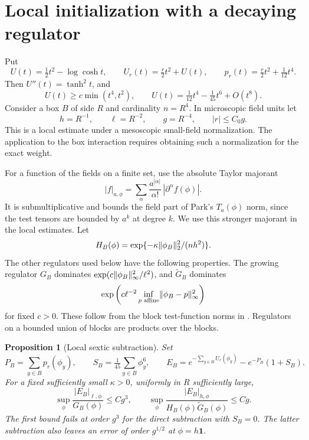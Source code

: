 \documentclass[11pt]{article}
\newtheorem{proposition}{Proposition}[section]
\DeclarePairedDelimiter{\norm}{\lVert}{\rVert}
\begin{document}
\section{Local initialization with a decaying regulator}

Put
\[
U(t)=\tfrac12t^2-\log\cosh t,\qquad
U_r(t)=\tfrac r2t^2+U(t),\qquad
p_r(t)=\tfrac r2t^2+\tfrac1{12}t^4.
\]
Then \(U''(t)=\tanh^2t\), and
\begin{equation}\label{eq:utaylor}
 U(t)\ge c\min(t^4,t^2),\qquad
 U(t)=\tfrac1{12}t^4-\tfrac1{45}t^6+O(t^8).
\end{equation}
Consider a box \(B\) of side \(R\) and cardinality \(n=R^4\). In microscopic field units let
\[
 h=R^{-1},\qquad \ell=R^{-2},\qquad g=R^{-4},
 \qquad |r|\le C_0g.
\]
This is a local estimate under a mesoscopic small-field normalization. The application to the box interaction requires obtaining such a normalization for the exact weight.

For a function of the fields on a finite set, use the absolute Taylor majorant
\[
 |f|_{a,\phi}=\sum_{\alpha}
 \frac{a^{|\alpha|}}{\alpha!}\,|\partial^\alpha f(\phi)|.
\]
It is submultiplicative and bounds the field part of Park's \(T_a(\phi)\) norm, since the test tensors are bounded by \(a^k\) at degree \(k\). We use this stronger majorant in the local estimates. Let
\[
 H_B(\phi)=\exp\{-\kappa\norm{\phi_B}_2^2/(nh^2)\}.
\]
The other regulators used below have the following properties. The growing regulator \(G_B\) dominates \(\exp(c\norm{\phi_B}_\infty^2/\ell^2)\), and \(\widetilde G_B\) dominates
\[
 \exp\left(c\ell^{-2}\inf_{p\text{ affine}}
                 \norm{\phi_B-p}_\infty^2\right)
\]
for fixed \(c>0\). These follow from the block test-function norms in \cite[\S 2.4]{ParkMap}. Regulators on a bounded union of blocks are products over the blocks.

\begin{proposition}[Local sextic subtraction]\label{prop:local}
Set
\[
 P_B=\sum_{y\in B}p_r(\phi_y),\qquad
 S_B=\tfrac1{45}\sum_{y\in B}\phi_y^6,\qquad
 E_B=e^{-\sum_{y\in B}U_r(\phi_y)}-e^{-P_B}(1+S_B).
\]
For a fixed sufficiently small \(\kappa>0\), uniformly in \(R\) sufficiently large,
\begin{equation}\label{eq:norms}
 \sup_\phi\frac{|E_B|_{\ell,\phi}}{G_B(\phi)}
     \le Cg^3,
 \qquad
 \sup_\phi\frac{|E_B|_{h,\phi}}{H_B(\phi)\widetilde G_B(\phi)}
     \le Cg.
\end{equation}
The first bound fails at order \(g^3\) for the direct subtraction with \(S_B=0\). The latter subtraction also leaves an error of order \(g^{1/2}\) at \(\phi=h\mathbf 1\).
\end{proposition}
\end{document}
